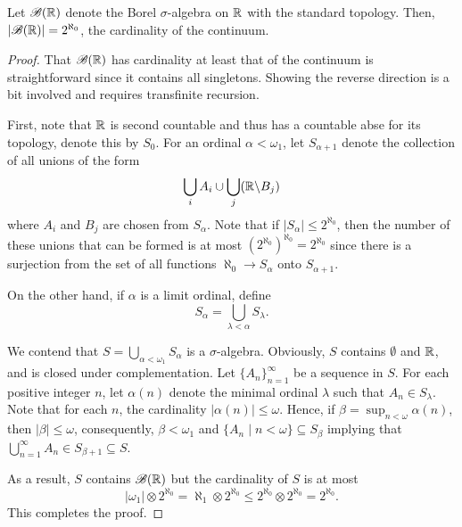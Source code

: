 \begin{theorem}
    Let $\mathscr B(\mathbb{R})$ denote the Borel $\sigma$-algebra on $\mathbb{R}$ with the standard topology. Then, $|\mathscr B(\mathbb{R})| = 2^{\aleph_0}$, the cardinality of the continuum.
\end{theorem}
\begin{proof}
    That $\mathscr B(\mathbb{R})$ has cardinality at least that of the continuum is straightforward since it contains all singletons. Showing the reverse direction is a bit involved and requires transfinite recursion.

    First, note that $\mathbb{R}$ is second countable and thus has a countable abse for its topology, denote this by $S_0$. For an ordinal $\alpha < \omega_1$, let $S_{\alpha + 1}$ denote the collection of all unions of the form 
    \begin{equation*}
        \bigcup_{i} A_i\cup\bigcup_{j}(\mathbb{R}\backslash B_j)
    \end{equation*}
    where $A_i$ and $B_j$ are chosen from $S_\alpha$. Note that if $|S_\alpha|\le 2^{\aleph_0}$, then the number of these unions that can be formed is at most $(2^{\aleph_0})^{\aleph_0} = 2^{\aleph_0}$ since there is a surjection from the set of all functions $\aleph_0\to S_\alpha$ onto $S_{\alpha + 1}$. 

    On the other hand, if $\alpha$ is a limit ordinal, define 
    \begin{equation*}
        S_{\alpha} = \bigcup_{\lambda < \alpha} S_\lambda.
    \end{equation*}

    We contend that $S = \bigcup_{\alpha < \omega_1}S_\alpha$ is a $\sigma$-algebra. Obviously, $S$ contains $\emptyset$ and $\mathbb{R}$, and is closed under complementation. Let $\{A_n\}_{n = 1}^\infty$ be a sequence in $S$. For each positive integer $n$, let $\alpha(n)$ denote the minimal ordinal $\lambda$ such that $A_n\in S_{\lambda}$. Note that for each $n$, the cardinality $|\alpha(n)|\le\omega$. Hence, if $\beta = \sup_{n < \omega}\alpha(n)$, then $|\beta|\le\omega$, consequently, $\beta < \omega_1$ and $\{A_n\mid n < \omega\}\subseteq S_{\beta}$ implying that $\bigcup_{n = 1}^\infty A_n\in S_{\beta + 1}\subseteq S$. 

    As a result, $S$ contains $\mathscr B(\mathbb{R})$ but the cardinality of $S$ is at most 
    \begin{equation*}
        |\omega_1|\otimes 2^{\aleph_0} = \aleph_1\otimes 2^{\aleph_0}\le 2^{\aleph_0}\otimes 2^{\aleph_0} = 2^{\aleph_0}.
    \end{equation*}
    This completes the proof.
\end{proof}

